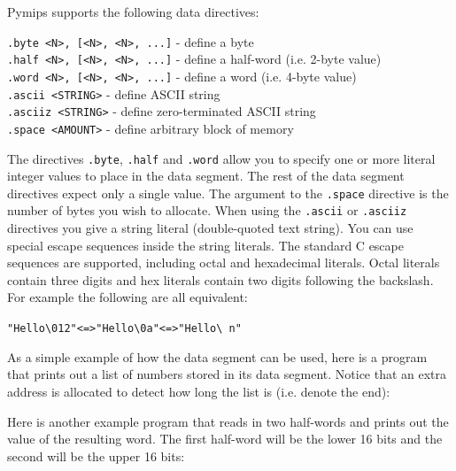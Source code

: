 \documentclass[12pt]{article}
\begin{document}
Pymips supports the following data directives:\\

\begin{addmargin}[0.5in]{0.5in}
    \texttt{.byte <N>, [<N>, <N>, ...]} - define a byte\\
    \texttt{.half <N>, [<N>, <N>, ...]} - define a half-word (i.e. 2-byte value)\\
    \texttt{.word <N>, [<N>, <N>, ...]} - define a word (i.e. 4-byte value)\\
    \texttt{.ascii <STRING>} - define ASCII string\\
    \texttt{.asciiz <STRING>} - define zero-terminated ASCII string\\
    \texttt{.space <AMOUNT>} - define arbitrary block of memory\\
\end{addmargin}

The directives \texttt{.byte}, \texttt{.half} and \texttt{.word} allow you to
     specify one or more literal integer values to place in the data
     segment. The rest of the data segment directives expect only a single
     value. The argument to the \texttt{.space} directive is the number of bytes
     you wish to allocate. When using the \texttt{.ascii} or \texttt{.asciiz}
     directives you give a string literal (double-quoted text string). You can
     use special escape sequences inside the string literals. The standard C
     escape sequences are supported, including octal and hexadecimal
     literals. Octal literals contain three digits and hex literals contain two
     digits following the backslash. For example the following are all
     equivalent:\\

\begin{addmargin}[0.5in]{0.5in}
    \begin{alltt}
        "Hello\textbackslash012" <=> "Hello\textbackslash0a" <=> "Hello\textbackslash\,n"
    \end{alltt}
\end{addmargin}

As a simple example of how the data segment can be used, here is a program that
     prints out a list of numbers stored in its data segment. Notice that an
     extra address is allocated to detect how long the list is (i.e. denote the
     end):\\
\newpage


Here is another example program that reads in two half-words and prints out the
     value of the resulting word. The first half-word will be the lower 16 bits
     and the second will be the upper 16 bits:
\end{document}
